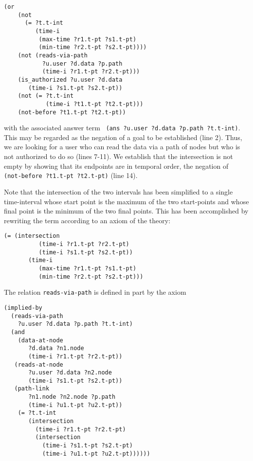 \begin{lstlisting}[] 
   (or 
    (not 
      (= ?t.t-int
         (time-i 
          (max-time ?r1.t-pt ?s1.t-pt)
          (min-time ?r2.t-pt ?s2.t-pt))))
    (not (reads-via-path
           ?u.user ?d.data ?p.path
           (time-i ?r1.t-pt ?r2.t-pt)))
    (is_authorized ?u.user ?d.data
       (time-i ?s1.t-pt ?s2.t-pt))
    (not (= ?t.t-int
            (time-i ?t1.t-pt ?t2.t-pt)))
    (not-before ?t1.t-pt ?t2.t-pt))
\end{lstlisting}
with the associated answer term \verb' (ans ?u.user ?d.data ?p.path ?t.t-int)'.
This may be regarded as the negation of a goal to be established (line 2).
Thus, we are looking for a user who can read the data via a path of nodes but who is not authorized to do so (lines 7-11).
We establish that the intersection is not empty by showing that its endpoints are in temporal order, \ie the negation of \verb' (not-before ?t1.t-pt ?t2.t-pt)' (line 14).

Note that the intersection of the two intervals has been simplified to a single time-interval whose start point is the maximum of the two start-points and whose final point is the minimum of the two final points.  
This has been accomplished by rewriting the term according to an axiom of the theory:

\begin{lstlisting}[numbers=none]
 (= (intersection
          (time-i ?r1.t-pt ?r2.t-pt)
          (time-i ?s1.t-pt ?s2.t-pt))
       (time-i
          (max-time ?r1.t-pt ?s1.t-pt)
          (min-time ?r2.t-pt ?s2.t-pt)))
\end{lstlisting}


The relation \verb'reads-via-path' is defined in part by the axiom

\begin{lstlisting}
(implied-by
  (reads-via-path
    ?u.user ?d.data ?p.path ?t.t-int)
  (and
    (data-at-node 
       ?d.data ?n1.node 
       (time-i ?r1.t-pt ?r2.t-pt))
   (reads-at-node 
       ?u.user ?d.data ?n2.node 
       (time-i ?s1.t-pt ?s2.t-pt))
   (path-link 
       ?n1.node ?n2.node ?p.path 
       (time-i ?u1.t-pt ?u2.t-pt))   
    (= ?t.t-int
       (intersection
	     (time-i ?r1.t-pt ?r2.t-pt)
	     (intersection
           (time-i ?s1.t-pt ?s2.t-pt)
           (time-i ?u1.t-pt ?u2.t-pt))))))
\end{lstlisting}

